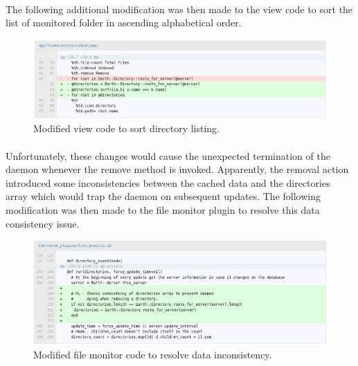 \documentclass[10pt,a4,oneside]{article}
\begin{document}
\paragraph{}
The following additional modification was then made to the view code 
to sort the list of monitored folder in ascending alphabetical order.


\begin{figure}[h!]
\begin{centering}
\includegraphics[width=150mm]{figs/earthshow2}
\end{centering}
\caption{Modified view code to sort directory listing.}
\label{fig:earthshow2}
\end{figure}


\newpage

\paragraph{}
Unfortunately, these changes would cause the unexpected termination 
of the daemon whenever the remove method is invoked. Apparently, the 
removal action introduced some inconsistencies between the cached 
data and the directories array which would trap the daemon on 
subsequent updates. The following modification was then made to the 
file monitor plugin to resolve this data consistency issue.



\begin{figure}[h!]
\begin{centering}
\includegraphics[width=150mm]{figs/filemonitor}
\end{centering}
\caption{Modified file monitor code to resolve data inconsistency.}
\label{fig:filemonitor}
\end{figure}
\end{document}
